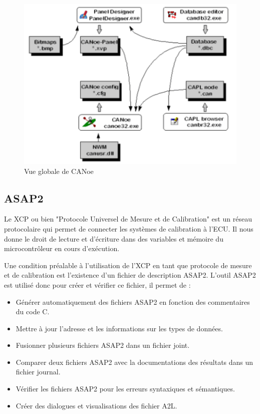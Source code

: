 \begin{figure}[H]
 \centering
 \includegraphics[scale=1]{images/global_view_canoe}
 \caption{Vue globale de CANoe}
\end{figure}

\subsection{ASAP2}

Le XCP ou bien "Protocole Universel de Mesure et de Calibration" est un réseau protocolaire qui permet de connecter les systèmes de calibration à l'ECU. Il nous donne le droit de lecture et d'écriture dans des variables et mémoire du microcontrôleur en cours d'exécution.

Une condition préalable à l'utilisation de l'XCP en tant que protocole de mesure et de calibration est l'existence d'un fichier de description ASAP2. L'outil ASAP2 est utilisé donc pour créer et vérifier ce fichier, il permet de : 

\begin{itemize}
	\item Générer automatiquement des fichiers ASAP2 en fonction des commentaires du code C.
	\item Mettre à jour l'adresse et les informations sur les types de données.
	\item Fusionner plusieurs fichiers ASAP2 dans un fichier joint.
	\item Comparer deux fichiers ASAP2 avec la documentations des résultats dans un fichier journal.
	\item Vérifier les fichiers ASAP2 pour les erreurs syntaxiques et sémantiques.
	\item Créer des dialogues et visualisations des fichier A2L.
\end{itemize}

